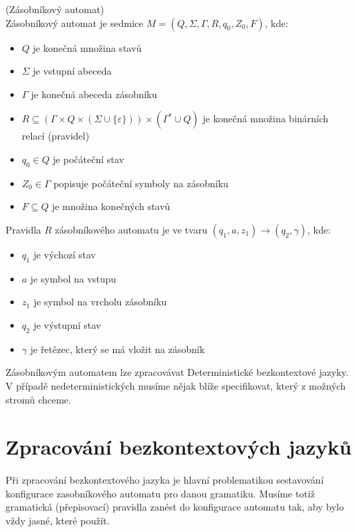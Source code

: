 \begin{defn}
  (Zásobníkový automat)\\
  Zásobníkový automat je sedmice $M = (Q, \Sigma, \Gamma, R, q_0, Z_0, F)$, kde:
  \begin{itemize}
    \item $Q$ je konečná množina stavů
    \item $\Sigma$ je vstupní abeceda
    \item $\Gamma$ je konečná abeceda zásobníku
    \item $R \subseteq (\Gamma \times Q \times (\Sigma \cup \{\varepsilon\} ))
    \times (\Gamma^* \cup Q)$ je konečná množina binárních relací (pravidel)
    \item $q_0 \in Q$ je počáteční stav
    \item $Z_0 \in \Gamma$ popisuje počáteční symboly na zásobníku
    \item $F \subseteq Q$ je množina konečných stavů
  \end{itemize}

  \noindent
  Pravidla $R$ zásobníkového automatu je ve tvaru $(q_1, a, z_1) \rightarrow (q_2, \gamma)$, kde:

  \begin{itemize}
    \item $q_1$ je výchozí stav
    \item $a$ je symbol na vstupu
    \item $z_1$ je symbol na vrcholu zásobníku
    \item $q_2$ je výstupní stav
    \item $\gamma$ je řetězec, který se má vložit na zásobník
  \end{itemize}
  \vspace{-0.5cm}
\end{defn}

Zásobníkovým automatem lze zpracovávat Deterministické bezkontextové jazyky.
V případě nedeterministických musíme nějak blíže specifikovat, který z možných
stromů chceme.\\

\section{Zpracování bezkontextových jazyků}
\label{sec:CFLanguagesProcessing}

Při zpracování bezkontextového jazyka je hlavní problematikou
sestavování konfigurace zasobníkového automatu pro danou gramatiku.
Musíme totiž gramatická (přepisovací) pravidla zanést do konfigurace
automatu tak, aby bylo vždy jasné, které použít.\\

